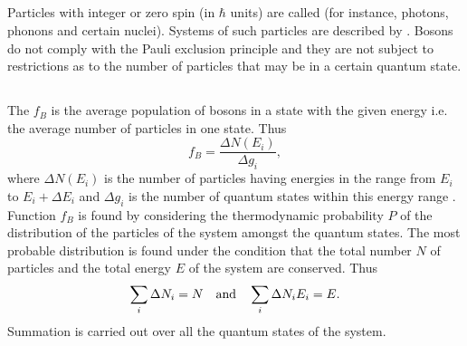 \subsection{}\label{41.2.1} Particles with integer or zero spin (in $\hbar$ units)  are called  (for instance, photons, phonons and certain nuclei). Systems of such particles are described by . Bosons do not comply with the Pauli exclusion principle  and they are not subject to restrictions as to the number of particles that may be in a certain quantum state.


\subsection{}\label{41.2.2} The  $f_{B}$ is the average population of bosons in a state with the given energy i.e. the average number of particles in one state. Thus
\begin{equation*}%
f_{B} = \frac{\Delta N (E_{i})}{\Delta  g_{i}},
\end{equation*}
where $\Delta N (E_{i})$ is the number of particles having energies in the range from $E_{i}$ to $E_{i} + \Delta E_{i}$ and $\Delta g_{i}$ is the number of quantum states within this energy range . Function $f_{B}$ is found by considering the thermodynamic probability $P$  of the distribution of the particles of the system amongst the quantum states. The most probable distribution is found under the condition that the total number $N$ of particles and the total energy $E$ of the system are conserved. Thus 
\begin{equation*}%
\sum_{i} \Delta N_{i} = N \qand \sum_{i} \Delta N_{i}E_{i} = E.
\end{equation*}
Summation is carried out over all the quantum states of the system.

